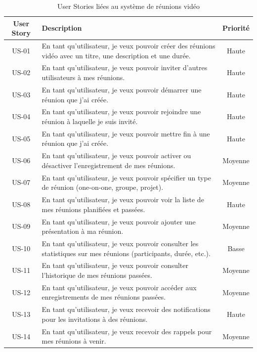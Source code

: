 \usepackage{tabularx}
\usepackage{float}
\usepackage{caption}

\begin{table}[H]
\centering
\begin{tabularx}{\textwidth}{|c|X|c|}
\hline
\textbf{User Story} & \textbf{Description} & \textbf{Priorité} \\
\hline
US-01 & En tant qu'utilisateur, je veux pouvoir créer des réunions vidéo avec un titre, une description et une durée. & Haute \\
\hline
US-02 & En tant qu'utilisateur, je veux pouvoir inviter d'autres utilisateurs à mes réunions. & Haute \\
\hline
US-03 & En tant qu'utilisateur, je veux pouvoir démarrer une réunion que j'ai créée. & Haute \\
\hline
US-04 & En tant qu'utilisateur, je veux pouvoir rejoindre une réunion à laquelle je suis invité. & Haute \\
\hline
US-05 & En tant qu'utilisateur, je veux pouvoir mettre fin à une réunion que j'ai créée. & Haute \\
\hline
US-06 & En tant qu'utilisateur, je veux pouvoir activer ou désactiver l'enregistrement de mes réunions. & Moyenne \\
\hline
US-07 & En tant qu'utilisateur, je veux pouvoir spécifier un type de réunion (one-on-one, groupe, projet). & Moyenne \\
\hline
US-08 & En tant qu'utilisateur, je veux pouvoir voir la liste de mes réunions planifiées et passées. & Haute \\
\hline
US-09 & En tant qu'utilisateur, je veux pouvoir ajouter une présentation à ma réunion. & Moyenne \\
\hline
US-10 & En tant qu'utilisateur, je veux pouvoir consulter les statistiques sur mes réunions (participants, durée, etc.). & Basse \\
\hline
US-11 & En tant qu'utilisateur, je veux pouvoir consulter l'historique de mes réunions passées. & Moyenne \\
\hline
US-12 & En tant qu'utilisateur, je veux pouvoir accéder aux enregistrements de mes réunions passées. & Moyenne \\
\hline
US-13 & En tant qu'utilisateur, je veux recevoir des notifications pour les invitations à des réunions. & Haute \\
\hline
US-14 & En tant qu'utilisateur, je veux recevoir des rappels pour mes réunions à venir. & Moyenne \\
\hline
\end{tabularx}
\caption{User Stories liées au système de réunions vidéo}
\end{table}

